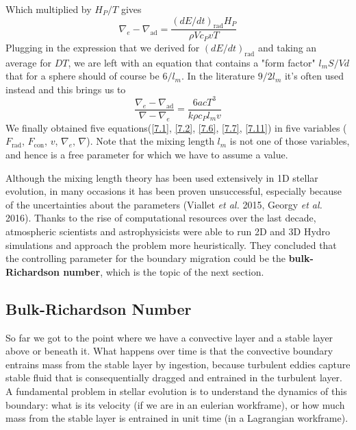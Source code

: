 Which multiplied by $H_P/T$ gives
\begin{equation}
\nabla_e - \nabla_{\mathrm{ad}} =  \frac{\left( dE/dt \right)_{ \mathrm{rad} } H_P}{\rho V c_P v T}
\end{equation}
Plugging in the expression that we derived for $(dE/dt)_{\mathrm{rad}}$ and taking an average for $DT$, we are left with an equation that contains a "form factor" $l_m S/Vd$ that for a sphere should of course be $6/l_m$. In the literature $9/2l_m$ it's often used instead and this brings us to
\begin{equation}\label{7.11}
\frac{\nabla_e - \nabla_{\mathrm{ad}}}{\nabla - \nabla_e} = \frac{6acT^3}{k \rho c_P l_m v}
\end{equation}
We finally obtained five equations(\ref{7.1}, \ref{7.2}, \ref{7.6}, \ref{7.7}, \ref{7.11}) in five variables ($F_{\mathrm{rad}}$, $F_{\mathrm{con}}$, $v$, $\nabla_e$, $\nabla$). Note that the mixing length $l_m$ is not one of those variables, and hence is a free parameter for which we have to assume a value. 

Although the mixing length theory has been used extensively in 1D stellar evolution, in many occasions it has been proven unsuccessful, especially because of the uncertainties about the parameters (Viallet \emph{et al.} 2015, Georgy \emph{et al.} 2016). Thanks to the rise of computational resources over the last decade, atmospheric scientists and astrophysicists were able to run 2D and 3D Hydro simulations and approach the problem more heuristically. They concluded that the controlling parameter for the boundary migration could be the \textbf{bulk-Richardson number}, which is the topic of the next section.  


\subsection{Bulk-Richardson Number}

So far we got to the point where we have a convective layer and a stable layer above or beneath it. What happens over time is that the convective boundary entrains mass from the stable layer by ingestion, because turbulent eddies capture stable fluid that is consequentially dragged and entrained in the turbulent layer. A fundamental problem in stellar evolution is to understand the dynamics of this boundary: what is its velocity (if we are in an eulerian workframe), or how much mass from the stable layer is entrained in unit time (in a Lagrangian workframe).

